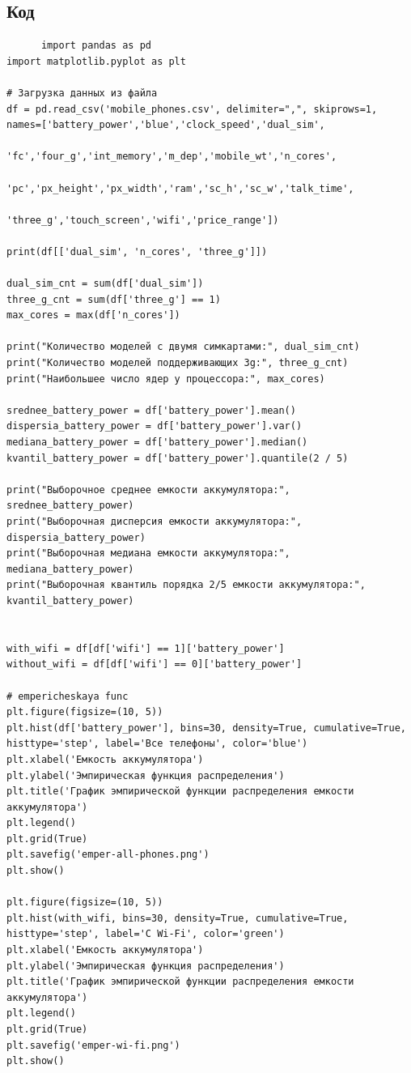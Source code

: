 \documentclass{article}
\begin{document}
\subsection{Код}
\begin{verbatim}
      import pandas as pd
import matplotlib.pyplot as plt

# Загрузка данных из файла
df = pd.read_csv('mobile_phones.csv', delimiter=",", skiprows=1, names=['battery_power','blue','clock_speed','dual_sim',
                                                            'fc','four_g','int_memory','m_dep','mobile_wt','n_cores',
                                                            'pc','px_height','px_width','ram','sc_h','sc_w','talk_time',
                                                            'three_g','touch_screen','wifi','price_range'])

print(df[['dual_sim', 'n_cores', 'three_g']])

dual_sim_cnt = sum(df['dual_sim'])
three_g_cnt = sum(df['three_g'] == 1)
max_cores = max(df['n_cores'])

print("Количество моделей с двумя симкартами:", dual_sim_cnt)
print("Количество моделей поддерживающих 3g:", three_g_cnt)
print("Наибольшее число ядер у процессора:", max_cores)

srednee_battery_power = df['battery_power'].mean()
dispersia_battery_power = df['battery_power'].var()
mediana_battery_power = df['battery_power'].median()
kvantil_battery_power = df['battery_power'].quantile(2 / 5)

print("Выборочное среднее емкости аккумулятора:", srednee_battery_power)
print("Выборочная дисперсия емкости аккумулятора:", dispersia_battery_power)
print("Выборочная медиана емкости аккумулятора:", mediana_battery_power)
print("Выборочная квантиль порядка 2/5 емкости аккумулятора:", kvantil_battery_power)


with_wifi = df[df['wifi'] == 1]['battery_power']
without_wifi = df[df['wifi'] == 0]['battery_power']

# empericheskaya func
plt.figure(figsize=(10, 5))
plt.hist(df['battery_power'], bins=30, density=True, cumulative=True, histtype='step', label='Все телефоны', color='blue')
plt.xlabel('Емкость аккумулятора')
plt.ylabel('Эмпирическая функция распределения')
plt.title('График эмпирической функции распределения емкости аккумулятора')
plt.legend()
plt.grid(True)
plt.savefig('emper-all-phones.png')
plt.show()

plt.figure(figsize=(10, 5))
plt.hist(with_wifi, bins=30, density=True, cumulative=True, histtype='step', label='С Wi-Fi', color='green')
plt.xlabel('Емкость аккумулятора')
plt.ylabel('Эмпирическая функция распределения')
plt.title('График эмпирической функции распределения емкости аккумулятора')
plt.legend()
plt.grid(True)
plt.savefig('emper-wi-fi.png')
plt.show()


\end{verbatim}
\end{document}
